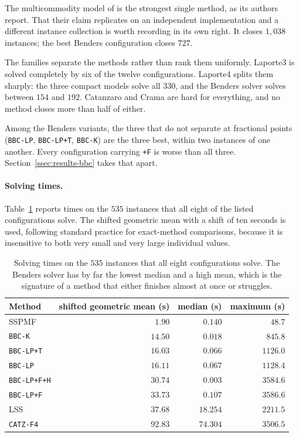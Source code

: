 The multicommodity model of \citet{daSilva2024} is the strongest single method, as its
authors report. That their claim replicates on an independent implementation and a
different instance collection is worth recording in its own right. It closes $1{,}038$
instances; the best Benders configuration closes $727$.

The families separate the methods rather than rank them uniformly. Laporte3 is solved
completely by six of the twelve configurations. Laporte4 splits them sharply: the
three compact models solve all $330$, and the Benders solver solves between $154$ and
$192$. Catanzaro and Crama are hard for everything, and no method closes more than
half of either.

Among the Benders variants, the three that do not separate at fractional points
(\texttt{BBC-LP}, \texttt{BBC-LP+T}, \texttt{BBC-K}) are the three best, within two
instances of one another. Every configuration carrying \texttt{+F} is worse than all
three. Section~\ref{ssec:results-bbc} takes that apart.

\paragraph{Solving times.}
Table~\ref{tab:times} reports times on the $535$ instances that all eight of the listed
configurations solve. The shifted geometric mean with a shift of ten seconds is used,
following standard practice for exact-method comparisons, because it is insensitive to
both very small and very large individual values.

\begin{table}[h]\centering
\footnotesize
\begin{tabular}{@{}lrrr@{}}
\toprule
Method & shifted geometric mean (s) & median (s) & maximum (s)\\
\midrule
SSPMF              & $1.90$  & $0.140$  & $48.7$\\
\texttt{BBC-K}     & $14.50$ & $0.018$  & $845.8$\\
\texttt{BBC-LP+T}  & $16.03$ & $0.066$  & $1126.0$\\
\texttt{BBC-LP}    & $16.11$ & $0.067$  & $1128.4$\\
\texttt{BBC-LP+F+H}& $30.74$ & $0.003$  & $3584.6$\\
\texttt{BBC-LP+F}  & $33.73$ & $0.107$  & $3586.6$\\
LSS                & $37.68$ & $18.254$ & $2211.5$\\
\texttt{CATZ-F4}   & $92.83$ & $74.304$ & $3506.5$\\
\bottomrule
\end{tabular}
\caption{Solving times on the $535$ instances that all eight configurations solve. The
Benders solver has by far the lowest median and a high mean, which is the signature of
a method that either finishes almost at once or struggles.}
\label{tab:times}
\end{table}

